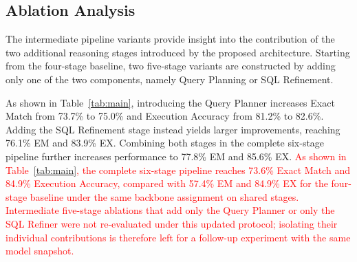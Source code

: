 \documentclass{svproc}
\begin{document}

\subsection{Ablation Analysis}
\label{subsec:ablation}

The intermediate pipeline variants provide insight into the contribution of the two additional reasoning stages introduced by the proposed architecture. Starting from the four-stage baseline, two five-stage variants are constructed by adding only one of the two components, namely Query Planning or SQL Refinement.

As shown in Table~\ref{tab:main}, introducing the Query Planner increases Exact Match from 73.7\% to 75.0\% and Execution Accuracy from 81.2\% to 82.6\%. Adding the SQL Refinement stage instead yields larger improvements, reaching 76.1\% EM and 83.9\% EX. Combining both stages in the complete six-stage pipeline further increases performance to 77.8\% EM and 85.6\% EX.
\textcolor{red}{As shown in Table~\ref{tab:main}, the complete six-stage pipeline reaches 73.6\% Exact Match and 84.9\% Execution Accuracy, compared with 57.4\% EM and 84.9\% EX for the four-stage baseline under the same backbone assignment on shared stages. Intermediate five-stage ablations that add only the Query Planner or only the SQL Refiner were not re-evaluated under this updated protocol; isolating their individual contributions is therefore left for a follow-up experiment with the same model snapshot.}

\end{document}
